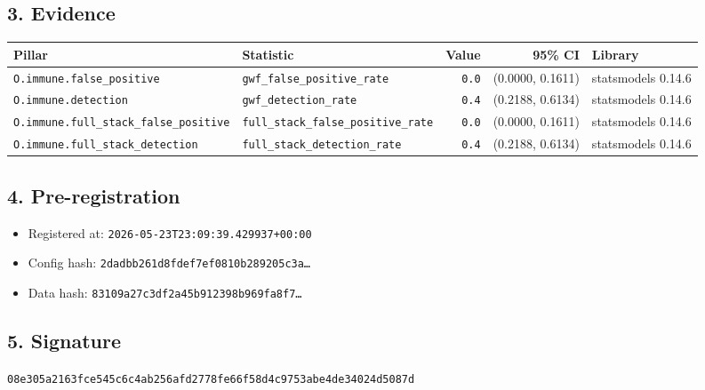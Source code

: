 \documentclass{article}
\begin{document}
\subsection*{3. Evidence}
\begin{tabular}{llrrl}\toprule
\textbf{Pillar} & \textbf{Statistic} & \textbf{Value} & \textbf{95\% CI} & \textbf{Library} \\\midrule
\texttt{O.immune.false\_positive} & \texttt{gwf\_false\_positive\_rate} & \texttt{0.0} & (0.0000, 0.1611) & statsmodels 0.14.6 \\
\texttt{O.immune.detection} & \texttt{gwf\_detection\_rate} & \texttt{0.4} & (0.2188, 0.6134) & statsmodels 0.14.6 \\
\texttt{O.immune.full\_stack\_false\_positive} & \texttt{full\_stack\_false\_positive\_rate} & \texttt{0.0} & (0.0000, 0.1611) & statsmodels 0.14.6 \\
\texttt{O.immune.full\_stack\_detection} & \texttt{full\_stack\_detection\_rate} & \texttt{0.4} & (0.2188, 0.6134) & statsmodels 0.14.6 \\
\bottomrule\end{tabular}
\subsection*{4. Pre-registration}
\begin{itemize}
\item Registered at: \texttt{2026-05-23T23:09:39.429937+00:00}
\item Config hash: \texttt{2dadbb261d8fdef7ef0810b289205c3a\dots}
\item Data hash: \texttt{83109a27c3df2a45b912398b969fa8f7\dots}
\end{itemize}
\subsection*{5. Signature}
\texttt{08e305a2163fce545c6c4ab256afd2778fe66f58d4c9753abe4de34024d5087d}\\
\end{document}
